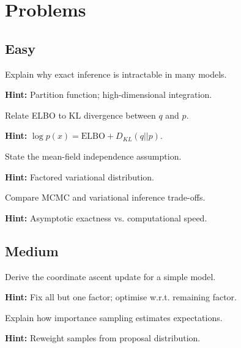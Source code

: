 
\section*{Problems}

\subsection*{Easy}

\begin{problem}
Explain why exact inference is intractable in many models.

\textbf{Hint:} Partition function; high-dimensional integration.
\end{problem}

\begin{problem}
Relate ELBO to KL divergence between $q$ and $p$.

\textbf{Hint:} $\log p(x) = \text{ELBO} + D_{KL}(q||p)$.
\end{problem}

\begin{problem}
State the mean-field independence assumption.

\textbf{Hint:} Factored variational distribution.
\end{problem}

\begin{problem}[MCMC vs. VI]
Compare MCMC and variational inference trade-offs.

\textbf{Hint:} Asymptotic exactness vs. computational speed.
\end{problem}

\subsection*{Medium}

\begin{problem}
Derive the coordinate ascent update for a simple model.

\textbf{Hint:} Fix all but one factor; optimise w.r.t. remaining factor.
\end{problem}

\begin{problem}
Explain how importance sampling estimates expectations.

\textbf{Hint:} Reweight samples from proposal distribution.
\end{problem}


